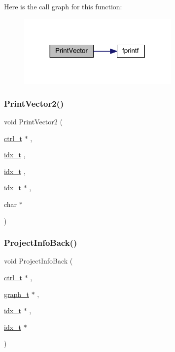 Here is the call graph for this function\+:\nopagebreak
\begin{figure}[H]
\begin{center}
\leavevmode
\includegraphics[width=224pt]{a00951_a5d1e6e3e93496e2e23f85e9153419fb1_cgraph}
\end{center}
\end{figure}
\mbox{\label{a00951_aeecc808c7210fbbc2e07a40b369ca718}} 
\subsubsection{\texorpdfstring{Print\+Vector2()}{PrintVector2()}}
{\footnotesize\ttfamily void Print\+Vector2 (\begin{DoxyParamCaption}\item[{\hyperlink{a00742}{ctrl\+\_\+t} $\ast$}]{,  }\item[{\hyperlink{a00876_aaa5262be3e700770163401acb0150f52}{idx\+\_\+t}}]{,  }\item[{\hyperlink{a00876_aaa5262be3e700770163401acb0150f52}{idx\+\_\+t}}]{,  }\item[{\hyperlink{a00876_aaa5262be3e700770163401acb0150f52}{idx\+\_\+t} $\ast$}]{,  }\item[{char $\ast$}]{ }\end{DoxyParamCaption})}

\mbox{\label{a00951_a3cb01af10ad9108ab44d7a1412df43be}} 
\subsubsection{\texorpdfstring{Project\+Info\+Back()}{ProjectInfoBack()}}
{\footnotesize\ttfamily void Project\+Info\+Back (\begin{DoxyParamCaption}\item[{\hyperlink{a00742}{ctrl\+\_\+t} $\ast$}]{,  }\item[{\hyperlink{a00734}{graph\+\_\+t} $\ast$}]{,  }\item[{\hyperlink{a00876_aaa5262be3e700770163401acb0150f52}{idx\+\_\+t} $\ast$}]{,  }\item[{\hyperlink{a00876_aaa5262be3e700770163401acb0150f52}{idx\+\_\+t} $\ast$}]{ }\end{DoxyParamCaption})}

